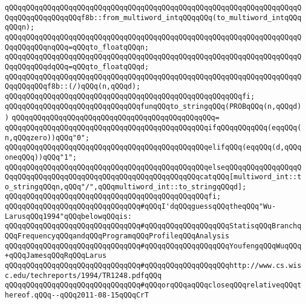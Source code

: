 \verb|qQQqqQQqqQQqqQQqqQQqqQQqqQQqqQQqqQQqqQQqqQQqqQQqqQQqqQQqqQQqqQQqqQQqqQQqqQQqqQQqqQQqqQQqf8b::from_multiword_intqQQqqQQq(to_multiword_intqQQqqQQqn);|\newline
\newline
\verb|qQQqqQQqqQQqqQQqqQQqqQQqqQQqqQQqqQQqqQQqqQQqqQQqqQQqqQQqqQQqqQQqqQQqqQQqqQQqqQQqnqQQq=qQQqto_floatqQQqn;|\newline
\verb|qQQqqQQqqQQqqQQqqQQqqQQqqQQqqQQqqQQqqQQqqQQqqQQqqQQqqQQqqQQqqQQqqQQqqQQqqQQqqQQqdqQQq=qQQqto_floatqQQqd;|\newline
\newline
\verb|qQQqqQQqqQQqqQQqqQQqqQQqqQQqqQQqqQQqqQQqqQQqqQQqqQQqqQQqqQQqqQQqqQQqqQQqqQQqqQQqf8b::(/)qQQq(n,qQQqd);|\newline
\verb|qQQqqQQqqQQqqQQqqQQqqQQqqQQqqQQqqQQqqQQqqQQqqQQqqQQqqQQqfi;|\newline
\newline
\verb|qQQqqQQqqQQqqQQqqQQqqQQqqQQqqQQqfunqQQqto_stringqQQq(PROBqQQq(n,qQQqd))|\newline
\verb|qQQqqQQqqQQqqQQqqQQqqQQqqQQqqQQqqQQqqQQqqQQqqQQq=|\newline
\verb|qQQqqQQqqQQqqQQqqQQqqQQqqQQqqQQqqQQqqQQqqQQqqQQqifqQQqqQQqqQQq(eqqQQq(n,qQQqzero))qQQq"0";|\newline
\verb|qQQqqQQqqQQqqQQqqQQqqQQqqQQqqQQqqQQqqQQqqQQqqQQqelifqQQq(eqqQQq(d,qQQqoneqQQq))qQQq"1";|\newline
\verb|qQQqqQQqqQQqqQQqqQQqqQQqqQQqqQQqqQQqqQQqqQQqqQQqelseqQQqqQQqqQQqqQQqqQQqqQQqqQQqqQQqqQQqqQQqqQQqqQQqqQQqqQQqqQQqqQQqcatqQQq[multiword_int::to_stringqQQqn,qQQq"/",qQQqmultiword_int::to_stringqQQqd];|\newline
\verb|qQQqqQQqqQQqqQQqqQQqqQQqqQQqqQQqqQQqqQQqqQQqqQQqfi;|\newline
\newline
\verb|qQQqqQQqqQQqqQQqqQQqqQQqqQQqqQQq#qQQqI'dqQQqguessqQQqtheqQQq"Wu-LarusqQQq1994"qQQqbelowqQQqis:|\newline
\verb|qQQqqQQqqQQqqQQqqQQqqQQqqQQqqQQq#qQQqqQQqqQQqqQQqqQQqStatisqQQqBranchqQQqFrequencyqQQqandqQQqProgramqQQqProfileqQQqAnalysis|\newline
\verb|qQQqqQQqqQQqqQQqqQQqqQQqqQQqqQQq#qQQqqQQqqQQqqQQqqQQqYoufengqQQqWuqQQq+qQQqJamesqQQqRqQQqLarus|\newline
\verb|qQQqqQQqqQQqqQQqqQQqqQQqqQQqqQQq#qQQqqQQqqQQqqQQqqQQqhttp://www.cs.wisc.edu/techreports/1994/TR1248.pdfqQQq|\newline
\verb|qQQqqQQqqQQqqQQqqQQqqQQqqQQqqQQq#qQQqorqQQqaqQQqcloseqQQqrelativeqQQqthereof.qQQq--qQQq2011-08-15qQQqCrT|\newline
